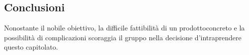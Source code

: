 \subsection{Conclusioni}
Nonostante il nobile obiettivo, la difficile fattibilità di un prodotto\glosp concreto e la possibilità di complicazioni scoraggia il gruppo nella decisione d'intraprendere questo capitolato\glo.
